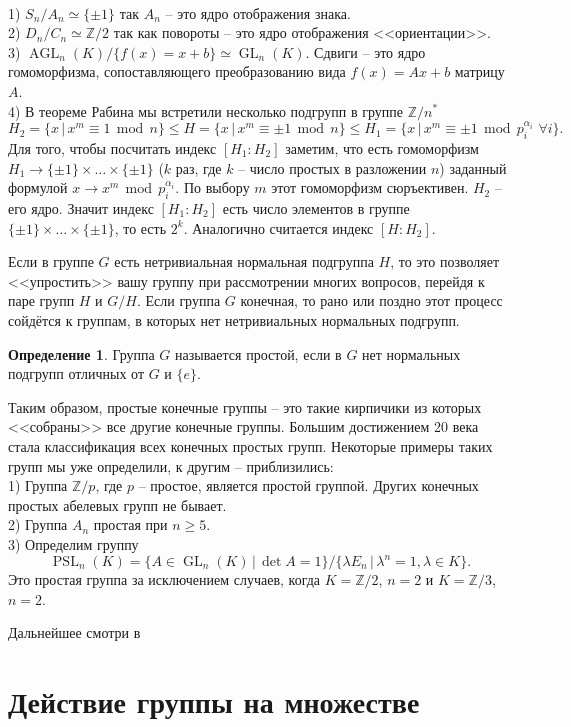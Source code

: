 \documentclass[10pt,a4paper,oneside]{book}
\theoremstyle{definition}
\newtheorem*{defn}{\color{yellow!30!red} Определение}
\renewcommand{\leq}{\leqslant}
\renewcommand{\geq}{\geqslant}
\renewcommand{\mod}{\,\operatorname{mod}\,}
\newcommand{\mb}[1]{\mathbb{#1}}
\newcommand{\GL}{\operatorname{GL}}
\newcommand{\AGL}{\operatorname{AGL}}
\newcommand{\PSL}{\operatorname{PSL}}
\def\exm{\noindent {\bf Примеры:}}
\def\dfn{\begin{defn}}
\def\edfn{\end{defn}}
\begin{document}
\exm \\
1) $S_n/A_n\simeq \{\pm 1\}$ так $A_n$  -- это ядро отображения знака.\\
2) $D_n/C_n \simeq \mb Z/2$ так как повороты -- это ядро отображения <<ориентации>>.\\
3) $\AGL_n(K)/\{f(x)=x+b\}\simeq \GL_n(K)$. Сдвиги -- это ядро гомоморфизма, сопоставляющего преобразованию вида $f(x)=Ax+b$ матрицу $A$.\\
4) В теореме Рабина мы встретили несколько подгрупп в группе $\mb Z/n^*$ 
$$H_2=\{ x\,|\, x^m\equiv 1 \mod n\} \leq H=\{ x\,|\, x^m\equiv \pm 1 \mod n\} \leq H_1=\{ x\,|\, x^m \equiv \pm 1 \mod p_i^{\alpha_i} \,\,\forall i\}.$$
Для того, чтобы посчитать индекс $[H_1: H_2]$ заметим, что есть гомоморфизм $H_1 \to \{\pm 1\}\times \dots \times \{\pm 1\} $ ($k$ раз, где $k$ -- число простых в разложении $n$)  заданный формулой $x \to x^m \mod p_i^{\alpha_i}$. По выбору $m$ этот гомоморфизм сюръективен. $H_2$ -- его ядро. Значит индекс $[H_1:H_2]$ есть число элементов в группе $\{\pm 1\}\times \dots \times \{\pm 1\} $, то есть $2^k$. Аналогично считается индекс $[H:H_2]$.


Если в группе $G$ есть нетривиальная нормальная подгруппа $H$, то это позволяет <<упростить>> вашу группу при рассмотрении многих вопросов, перейдя к паре групп $H$ и $G/H$. Если группа $G$ конечная, то рано или поздно этот процесс сойдётся к группам, в которых нет нетривиальных нормальных подгрупп.


\dfn Группа $G$ называется простой, если в $G$ нет нормальных подгрупп отличных от $G$ и $\{e\}$.
\edfn

Таким образом, простые конечные группы -- это такие кирпичики из которых <<собраны>> все другие конечные группы. Большим достижением 20 века стала классификация всех конечных простых групп. Некоторые примеры таких групп мы уже определили, к другим -- приблизились:\\
1) Группа $\mb Z/p$, где $p$ -- простое, является простой группой. Других конечных простых абелевых групп не бывает.\\
2) Группа $A_n$ простая при $n\geq 5$.\\
3) Определим группу $$\PSL_n(K)=\{A \in \GL_n(K)\,|\, \det A=1\}/ \{ \lambda E_n\,|\, \lambda^n=1, \lambda\in K \}.$$
Это простая группа за исключением случаев, когда $K=\mb Z/2$, $n=2$ и  $K=\mb Z/3$, $n=2$.

Дальнейшее смотри в \cite{}


\section{Действие группы на множестве}
\end{document}
